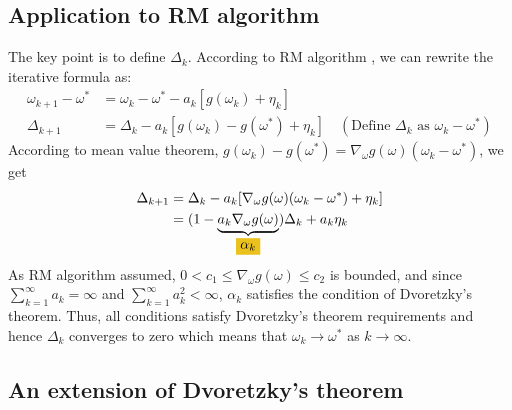 \subsection{Application to RM algorithm}

  The key point is to define $\Delta_{k}$. According to RM algorithm , we can rewrite the iterative formula as:
  \begin{align*}
    \omega_{k+1} - \omega^{*} & = \omega_{k} - \omega^{*} - a_{k}[g(\omega_{k})+\eta_{k}]                                                                      \\
    \Delta_{k+1}              & = \Delta_{k} - a_{k}[g(\omega_{k})-g(\omega^{*})+\eta_{k}] \quad (\text{Define } \Delta_{k} \text{ as } \omega_{k}-\omega^{*})
  \end{align*}
  According to mean value theorem, $g(\omega_{k})-g(\omega^{*})=\nabla_{\omega} g(\omega)(\omega_{k}-\omega^{*})$, we get
  \begin{align*}
    \Delta_{k+1} & = \Delta_{k} - a_{k}[\nabla_{\omega} g(\omega)(\omega_{k}-\omega^{*})+\eta_{k}]                                           \\
                 & = (1-\underbrace{a_{k}\nabla_{\omega} g(\omega)}_{\colorbox{myyellow!80!myred}{$\alpha_{k}$}}) \Delta_{k} + a_{k}\eta_{k}
  \end{align*}
  As RM algorithm assumed, $0<c_{1}\le \nabla_{\omega} g(\omega) \le c_{2}$ is bounded, and since
  $\sum_{k=1}^{\infty}a_{k}=\infty$ and $\sum_{k=1}^{\infty}a_{k}^{2}<\infty$, $\alpha_{k}$ satisfies the condition of
  Dvoretzky's theorem. Thus, all conditions satisfy Dvoretzky's theorem requirements  and hence $\Delta_{k}$ converges to zero which means that $\omega_{k}
    \to \omega^{*}$ as $k\to \infty$.

\subsection{An extension of Dvoretzky's theorem}

